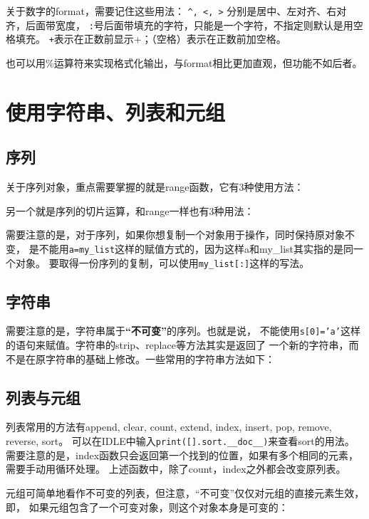 \documentclass{style/ucasproposal}
\newcommand{\inlinepython}[1]{\texttt{#1}}
\begin{document}
关于数字的format，需要记住这些用法：
\inlinepython{^, <, >} 分别是居中、左对齐、右对齐，后面带宽度，
\inlinepython{:}号后面带填充的字符，只能是一个字符，不指定则默认是用空格填充。
\inlinepython{+}表示在正数前显示+；（空格）表示在正数前加空格。


也可以用\%运算符来实现格式化输出，与format相比更加直观，但功能不如后者。


\section{使用字符串、列表和元组}
\subsection{序列}
关于序列对象，重点需要掌握的就是range函数，它有3种使用方法：

另一个就是序列的切片运算，和range一样也有3种用法：

需要注意的是，对于序列，如果你想复制一个对象用于操作，同时保持原对象不变，
是不能用\inlinepython{a=my_list}这样的赋值方式的，因为这样a和my\_list其实指的是同一个对象。
要取得一份序列的复制，可以使用\inlinepython{my_list[:]}这样的写法。

\subsection{字符串}
需要注意的是，字符串属于\textbf{``不可变''}的序列。也就是说，
不能使用\inlinepython{s[0]='a'}这样的语句来赋值。字符串的strip、replace等方法其实是返回了
一个新的字符串，而不是在原字符串的基础上修改。一些常用的字符串方法如下：

\subsection{列表与元组}
列表常用的方法有append, clear, count, extend, index, insert, pop, remove,
reverse, sort。
可以在IDLE中输入\inlinepython{print([].sort.__doc__)}来查看sort的用法。
需要注意的是，index函数只会返回第一个找到的位置，如果有多个相同的元素，需要手动用循环处理。
上述函数中，除了count，index之外都会改变原列表。

元组可简单地看作不可变的列表，但注意，``不可变''仅仅对元组的直接元素生效，即，
如果元组包含了一个可变对象，则这个对象本身是可变的：
\end{document}
